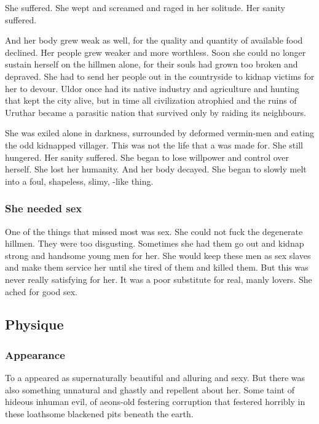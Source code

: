 She suffered.
She wept and screamed and raged in her solitude. 
Her sanity suffered.

And her body grew weak as well, for the quality and quantity of available food declined. 
Her people grew weaker and more worthless.
Soon she could no longer sustain herself on the hillmen alone, for their souls had grown too broken and depraved.
She had to send her people out in the countryside to kidnap victims for her to devour.
Uldor once had its native industry and agriculture and hunting that kept the city alive, but in time all civilization atrophied and the ruins of Uruthar became a parasitic nation that survived only by raiding its neighbours. 

She was exiled alone in darkness, surrounded by deformed vermin-men and eating the odd kidnapped villager.
This was not the life that a \resvil was made for. 
She still hungered.
Her sanity suffered. 
She began to lose willpower and control over herself.
She lost her humanity.
And her body decayed. 
She began to slowly melt into a foul, shapeless, slimy, \banespawn-like thing.





\subsubsection{She needed sex}
One of the things that \Lethiarch missed most was sex.
She could not fuck the degenerate hillmen. 
They were too disgusting. 
Sometimes she had them go out and kidnap strong and handsome young men for her.
She would keep these men as sex slaves and make them service her until she tired of them and killed them.
But this was never really satisfying for her.
It was a poor substitute for real, manly lovers.
She ached for good sex. 









\subsection{Physique}





\subsubsection{Appearance}
To a \human \Lethiarch appeared as supernaturally beautiful and alluring and sexy.
But there was also something unnatural and ghastly and repellent about her.
Some taint of hideous inhuman evil, of aeons-old festering corruption that festered horribly in these loathsome blackened pits beneath the earth. 









